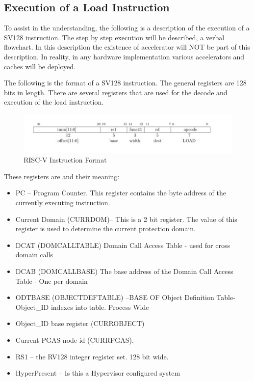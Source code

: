\documentclass{article}
\begin{document}
\pagebreak




\begin{appendices}


\section{Execution of a Load Instruction}


To assist in the understanding, the following is a description of the execution of a SV128 instruction.  The step by step execution will be described,  a verbal flowchart. In this description the existence of accelerator will NOT be part of this description.  In reality,  in any hardware implementation various accelerators and caches will be deployed. 

The following is the format of a SV128 instruction.  The general registers are 128 bits in length. There are several registers that are used for the decode and execution of the load instruction.  

\begin{figure}[h]
\includegraphics[scale= 1.1]{figures/isa_pgas_format.jpg}
\caption{RISC-V Instruction Format\label{fig:RISC-V ISA Format}}
\end{figure}
 


These registers are and their meaning:

\begin {itemize}
\item PC – Program Counter. This register contains the byte address of the currently executing instruction.
\item Current Domain  (CURRDOM)– This is a 2 bit register.  The value of this register is used to determine the current protection domain.
\item DCAT (DOMCALLTABLE) Domain Call Access Table - used for cross domain calls
\item DCAB (DOMCALLBASE) The base address of the Domain Call Access Table - One per  domain
\item ODTBASE (OBJECTDEFTABLE) –BASE OF Object Definition Table- Object\_ID indexes into table.  Process Wide
\item Object\_ID  base register (CURROBJECT)
\item Current PGAS node id (CURRPGAS).
\item RS1 – the RV128 integer register set.  128 bit wide.
\item HyperPresent – Is this a Hypervisor configured system


\end{itemize}
\end{appendices}
\end{document}
